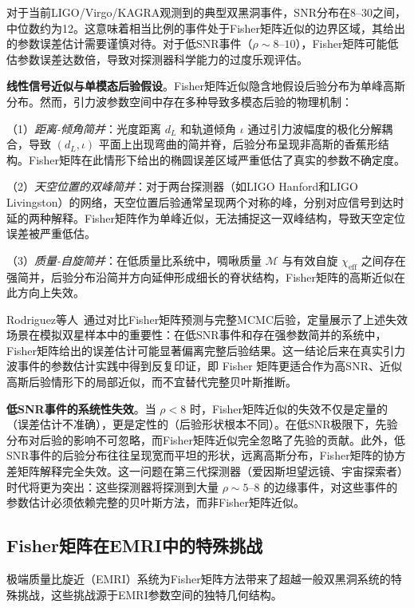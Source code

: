对于当前LIGO/Virgo/KAGRA观测到的典型双黑洞事件，SNR分布在8--30之间，中位数约为12。这意味着相当比例的事件处于Fisher矩阵近似的边界区域，其给出的参数误差估计需要谨慎对待。对于低SNR事件（$\rho \sim 8$--$10$），Fisher矩阵可能低估参数误差达数倍，导致对探测器科学能力的过度乐观评估。

\textbf{线性信号近似与单模态后验假设}。Fisher矩阵近似隐含地假设后验分布为单峰高斯分布。然而，引力波参数空间中存在多种导致多模态后验的物理机制：

（1）\textit{距离-倾角简并}：光度距离 $d_L$ 和轨道倾角 $\iota$ 通过引力波幅度的极化分解耦合，导致 $(d_L, \iota)$ 平面上出现弯曲的简并脊，后验分布呈现非高斯的香蕉形结构。Fisher矩阵在此情形下给出的椭圆误差区域严重低估了真实的参数不确定度。

（2）\textit{天空位置的双峰简并}：对于两台探测器（如LIGO Hanford和LIGO Livingston）的网络，天空位置后验通常呈现两个对称的峰，分别对应信号到达时延的两种解释。Fisher矩阵作为单峰近似，无法捕捉这一双峰结构，导致天空定位误差被严重低估。

（3）\textit{质量-自旋简并}：在低质量比系统中，啁啾质量 $\mathcal{M}$ 与有效自旋 $\chi_\mathrm{eff}$ 之间存在强简并，后验分布沿简并方向延伸形成细长的脊状结构，Fisher矩阵的高斯近似在此方向上失效。

Rodriguez等人~\cite{Rodriguez2013Fisher}通过对比Fisher矩阵预测与完整MCMC后验，定量展示了上述失效场景在模拟双星样本中的重要性：在低SNR事件和存在强参数简并的系统中，Fisher矩阵给出的误差估计可能显著偏离完整后验结果。这一结论后来在真实引力波事件的参数估计实践中得到反复印证，即 Fisher 矩阵更适合作为高SNR、近似高斯后验情形下的局部近似，而不宜替代完整贝叶斯推断。

\textbf{低SNR事件的系统性失效}。当 $\rho < 8$ 时，Fisher矩阵近似的失效不仅是定量的（误差估计不准确），更是定性的（后验形状根本不同）。在低SNR极限下，先验分布对后验的影响不可忽略，而Fisher矩阵近似完全忽略了先验的贡献。此外，低SNR事件的后验分布往往呈现宽而平坦的形状，远离高斯分布，Fisher矩阵的协方差矩阵解释完全失效。这一问题在第三代探测器（爱因斯坦望远镜、宇宙探索者）时代将更为突出：这些探测器将探测到大量 $\rho \sim 5$--$8$ 的边缘事件，对这些事件的参数估计必须依赖完整的贝叶斯方法，而非Fisher矩阵近似。

\subsection{Fisher矩阵在EMRI中的特殊挑战}

极端质量比旋近（EMRI）系统为Fisher矩阵方法带来了超越一般双黑洞系统的特殊挑战，这些挑战源于EMRI参数空间的独特几何结构。

